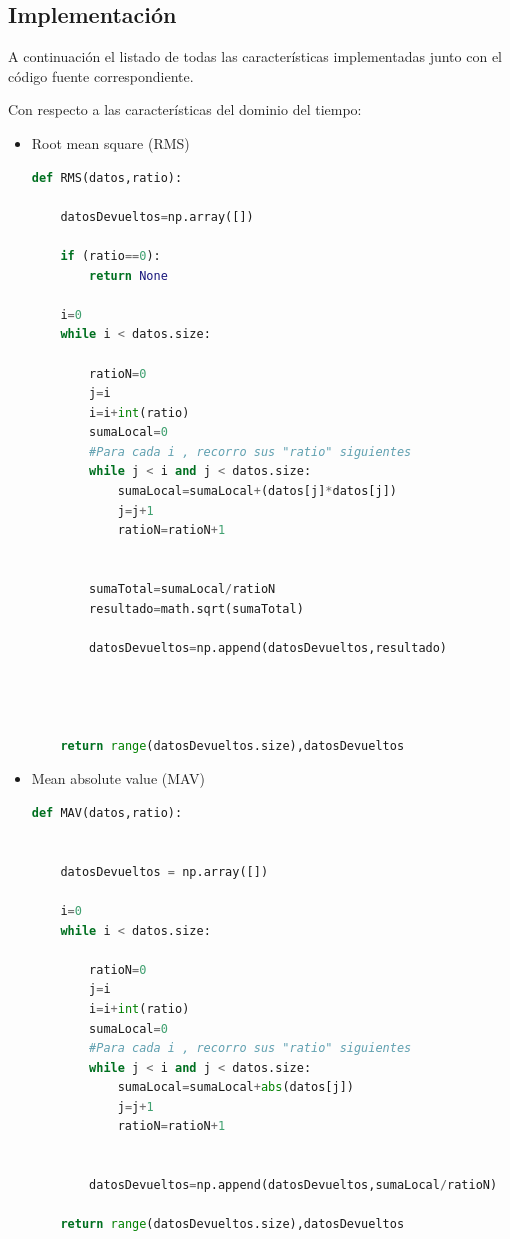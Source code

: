     \subsection{Implementación \label{anexocaracImple}}
A continuación el listado de todas las características implementadas junto con el código fuente correspondiente.

Con respecto a las características del dominio del tiempo:

\begin{itemize}
\item Root mean square (RMS)
\begin{lstlisting}[language=Python]
def RMS(datos,ratio):
    
    datosDevueltos=np.array([])
   
    if (ratio==0):
        return None

    i=0
    while i < datos.size:
        
        ratioN=0
        j=i
        i=i+int(ratio)
        sumaLocal=0
        #Para cada i , recorro sus "ratio" siguientes
        while j < i and j < datos.size:
            sumaLocal=sumaLocal+(datos[j]*datos[j])
            j=j+1
            ratioN=ratioN+1
         
        
        sumaTotal=sumaLocal/ratioN
        resultado=math.sqrt(sumaTotal) 
        
        datosDevueltos=np.append(datosDevueltos,resultado)
            
    
    

    return range(datosDevueltos.size),datosDevueltos
\end{lstlisting}

\newpage
\item Mean absolute value (MAV)
\begin{lstlisting}[language=Python]
def MAV(datos,ratio):
    
    
    datosDevueltos = np.array([])
    
    i=0
    while i < datos.size:
        
        ratioN=0
        j=i
        i=i+int(ratio)
        sumaLocal=0
        #Para cada i , recorro sus "ratio" siguientes
        while j < i and j < datos.size:
            sumaLocal=sumaLocal+abs(datos[j])
            j=j+1
            ratioN=ratioN+1
         
        
        datosDevueltos=np.append(datosDevueltos,sumaLocal/ratioN)
        
    return range(datosDevueltos.size),datosDevueltos
\end{lstlisting}


\end{itemize}
